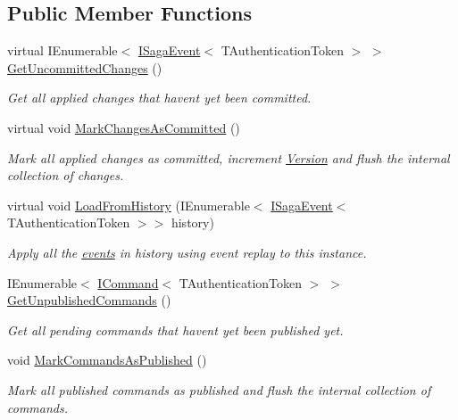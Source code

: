 \subsection*{Public Member Functions}
\begin{DoxyCompactItemize}
\item 
virtual I\+Enumerable$<$ \hyperlink{interfaceCqrs_1_1Events_1_1ISagaEvent}{I\+Saga\+Event}$<$ T\+Authentication\+Token $>$ $>$ \hyperlink{classCqrs_1_1Akka_1_1Domain_1_1AkkaSagaProxy_a8cad3415bc5474a01bfdb2db3a852ea5_a8cad3415bc5474a01bfdb2db3a852ea5}{Get\+Uncommitted\+Changes} ()
\begin{DoxyCompactList}\small\item\em Get all applied changes that haven\textquotesingle{}t yet been committed. \end{DoxyCompactList}\item 
virtual void \hyperlink{classCqrs_1_1Akka_1_1Domain_1_1AkkaSagaProxy_a5a5c012bc0f7f957b8bd2298956ca9ae_a5a5c012bc0f7f957b8bd2298956ca9ae}{Mark\+Changes\+As\+Committed} ()
\begin{DoxyCompactList}\small\item\em Mark all applied changes as committed, increment \hyperlink{classCqrs_1_1Akka_1_1Domain_1_1AkkaSagaProxy_ab6272400fe5c6227a11cf5c93f752d4d_ab6272400fe5c6227a11cf5c93f752d4d}{Version} and flush the internal collection of changes. \end{DoxyCompactList}\item 
virtual void \hyperlink{classCqrs_1_1Akka_1_1Domain_1_1AkkaSagaProxy_a21b69799b046c1fcdf5b2443699dee0c_a21b69799b046c1fcdf5b2443699dee0c}{Load\+From\+History} (I\+Enumerable$<$ \hyperlink{interfaceCqrs_1_1Events_1_1ISagaEvent}{I\+Saga\+Event}$<$ T\+Authentication\+Token $>$$>$ history)
\begin{DoxyCompactList}\small\item\em Apply all the \hyperlink{}{events} in {\itshape history}  using event replay to this instance. \end{DoxyCompactList}\item 
I\+Enumerable$<$ \hyperlink{interfaceCqrs_1_1Commands_1_1ICommand}{I\+Command}$<$ T\+Authentication\+Token $>$ $>$ \hyperlink{classCqrs_1_1Akka_1_1Domain_1_1AkkaSagaProxy_a959a64faad2d1a8f912c08362adab668_a959a64faad2d1a8f912c08362adab668}{Get\+Unpublished\+Commands} ()
\begin{DoxyCompactList}\small\item\em Get all pending commands that haven\textquotesingle{}t yet been published yet. \end{DoxyCompactList}\item 
void \hyperlink{classCqrs_1_1Akka_1_1Domain_1_1AkkaSagaProxy_aec2b133ce13d4bcda56de80f9637330a_aec2b133ce13d4bcda56de80f9637330a}{Mark\+Commands\+As\+Published} ()
\begin{DoxyCompactList}\small\item\em Mark all published commands as published and flush the internal collection of commands. \end{DoxyCompactList}\end{DoxyCompactItemize}

